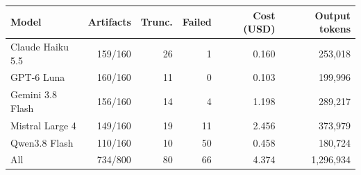 \begin{tabular}{@{}lrrrrr@{}}
\toprule
Model & Artifacts & Trunc. & Failed & Cost (USD) & Output tokens \\
\midrule
Claude Haiku 5.5 & 159/160 & 26 & 1 & 0.160 & 253{,}018 \\
GPT-6 Luna & 160/160 & 11 & 0 & 0.103 & 199{,}996 \\
Gemini 3.8 Flash & 156/160 & 14 & 4 & 1.198 & 289{,}217 \\
Mistral Large 4 & 149/160 & 19 & 11 & 2.456 & 373{,}979 \\
Qwen3.8 Flash & 110/160 & 10 & 50 & 0.458 & 180{,}724 \\
\midrule
All & 734/800 & 80 & 66 & 4.374 & 1{,}296{,}934 \\
\bottomrule
\end{tabular}
